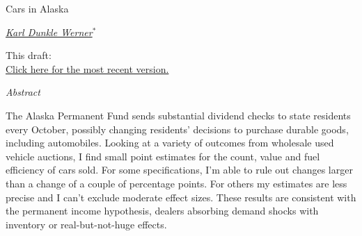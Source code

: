 \documentclass[11pt,letterpaper,oneside]{article}
\begin{document}
\thispagestyle{empty}
\setcounter{page}{0}
\vspace*{0.7in plus 0.3in minus 0.3in}

\begin{center}
    {\Huge Cars in Alaska}

    \href{mailto:karldw@berkeley.edu}{\textit{\Large Karl Dunkle Werner}}$^*$

\vspace{1em}
  This draft:
    \href{https://github.com/karldw/second_year_paper/tree/\gitHash}{
    \gitCommitterDate{}
    }
    \\
    \href{http://karldw.org/second_year_paper.pdf}{Click here for the most recent version.}
\end{center}

\vspace{2in plus 1in minus 0.7in}

\begin{center}
    \begin{minipage}{0.7\linewidth}
        \begin{center}
            \textit{Abstract}
        \end{center}
        The Alaska Permanent Fund sends substantial dividend checks to state residents every October, possibly changing residents' decisions to purchase durable goods, including automobiles.
        Looking at a variety of outcomes from wholesale used vehicle auctions, I find small point estimates for the count, value and fuel efficiency of cars sold.
        For some specifications, I'm able to rule out changes larger than a change of a couple of percentage points.
        For others my estimates are less precise and I can't exclude moderate effect sizes.
        These results are consistent with the permanent income hypothesis, dealers absorbing demand shocks with inventory or real\hyp{}but\hyp{}not\hyp{}huge effects.
    \end{minipage}
\end{center}
\end{document}
